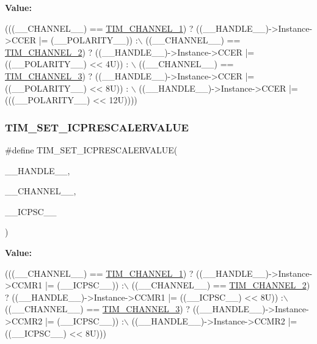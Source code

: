 {\bfseries Value\+:}
\begin{DoxyCode}
(((\_\_CHANNEL\_\_) == \hyperlink{group___t_i_m___channel_ga6b1541e4a49d62610899e24bf23f4879}{TIM\_CHANNEL\_1}) ? ((\_\_HANDLE\_\_)->Instance->CCER |= (\_\_POLARITY\_\_)) :\(\backslash\)
 ((\_\_CHANNEL\_\_) == \hyperlink{group___t_i_m___channel_ga33e02d43345a7ac5886f01b39e4f7ccd}{TIM\_CHANNEL\_2}) ? ((\_\_HANDLE\_\_)->Instance->CCER |= ((\_\_POLARITY\_\_) << 4U)) :
      \(\backslash\)
 ((\_\_CHANNEL\_\_) == \hyperlink{group___t_i_m___channel_ga4ea100c1789b178f3cb46721b7257e2d}{TIM\_CHANNEL\_3}) ? ((\_\_HANDLE\_\_)->Instance->CCER |= ((\_\_POLARITY\_\_) << 8U)) :
      \(\backslash\)
 ((\_\_HANDLE\_\_)->Instance->CCER |= (((\_\_POLARITY\_\_) << 12U))))
\end{DoxyCode}
\mbox{\label{group___t_i_m___private___macros_ga99724157918ca8b4d8babee1d8008dcb}} 
\subsubsection{\texorpdfstring{T\+I\+M\+\_\+\+S\+E\+T\+\_\+\+I\+C\+P\+R\+E\+S\+C\+A\+L\+E\+R\+V\+A\+L\+UE}{TIM\_SET\_ICPRESCALERVALUE}}
{\footnotesize\ttfamily \#define T\+I\+M\+\_\+\+S\+E\+T\+\_\+\+I\+C\+P\+R\+E\+S\+C\+A\+L\+E\+R\+V\+A\+L\+UE(\begin{DoxyParamCaption}\item[{}]{\+\_\+\+\_\+\+H\+A\+N\+D\+L\+E\+\_\+\+\_\+,  }\item[{}]{\+\_\+\+\_\+\+C\+H\+A\+N\+N\+E\+L\+\_\+\+\_\+,  }\item[{}]{\+\_\+\+\_\+\+I\+C\+P\+S\+C\+\_\+\+\_\+ }\end{DoxyParamCaption})}

{\bfseries Value\+:}
\begin{DoxyCode}
(((\_\_CHANNEL\_\_) == \hyperlink{group___t_i_m___channel_ga6b1541e4a49d62610899e24bf23f4879}{TIM\_CHANNEL\_1}) ? ((\_\_HANDLE\_\_)->Instance->CCMR1 |= (\_\_ICPSC\_\_)) :\(\backslash\)
 ((\_\_CHANNEL\_\_) == \hyperlink{group___t_i_m___channel_ga33e02d43345a7ac5886f01b39e4f7ccd}{TIM\_CHANNEL\_2}) ? ((\_\_HANDLE\_\_)->Instance->CCMR1 |= ((\_\_ICPSC\_\_) << 8U)) :\(\backslash\)
 ((\_\_CHANNEL\_\_) == \hyperlink{group___t_i_m___channel_ga4ea100c1789b178f3cb46721b7257e2d}{TIM\_CHANNEL\_3}) ? ((\_\_HANDLE\_\_)->Instance->CCMR2 |= (\_\_ICPSC\_\_)) :\(\backslash\)
 ((\_\_HANDLE\_\_)->Instance->CCMR2 |= ((\_\_ICPSC\_\_) << 8U)))
\end{DoxyCode}
